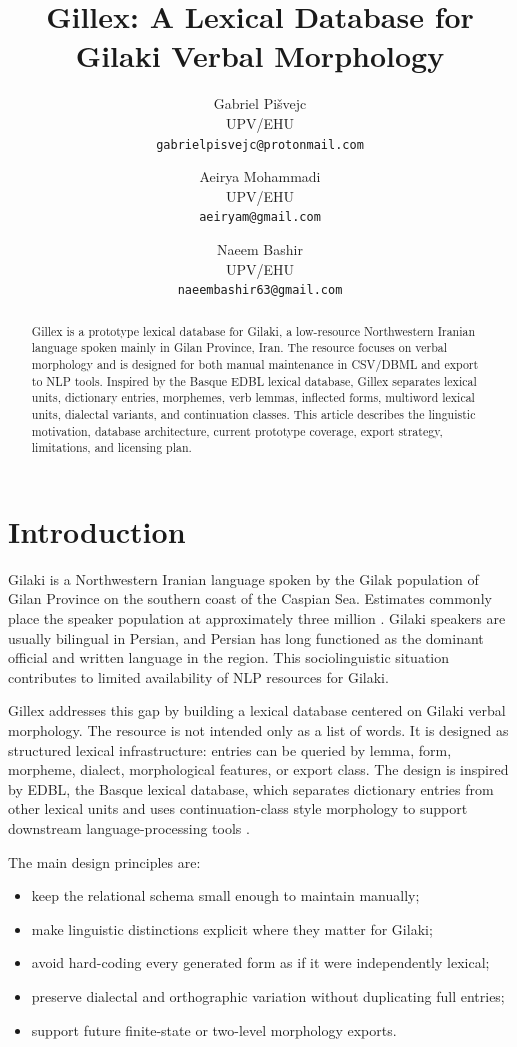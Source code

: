 \documentclass[11pt]{article}
\title{Gillex: A Lexical Database for Gilaki Verbal Morphology}
\author{Gabriel Pišvejc \\
  UPV/EHU \\
  \texttt{gabrielpisvejc@protonmail.com} \and
  Aeirya Mohammadi \\
  UPV/EHU \\
  \texttt{aeiryam@gmail.com} \and
  Naeem Bashir \\
  UPV/EHU \\
  \texttt{naeembashir63@gmail.com} \\}
\begin{document}
\maketitle

\begin{abstract}
Gillex is a prototype lexical database for Gilaki, a low-resource Northwestern Iranian language spoken mainly in Gilan Province, Iran. The resource focuses on verbal morphology and is designed for both manual maintenance in CSV/DBML and export to NLP tools. Inspired by the Basque EDBL lexical database, Gillex separates lexical units, dictionary entries, morphemes, verb lemmas, inflected forms, multiword lexical units, dialectal variants, and continuation classes. This article describes the linguistic motivation, database architecture, current prototype coverage, export strategy, limitations, and licensing plan.
\end{abstract}

\section{Introduction}

Gilaki is a Northwestern Iranian language spoken by the Gilak population of Gilan Province on the southern coast of the Caspian Sea. Estimates commonly place the speaker population at approximately three million \cite{ivanov2015gilaki}. Gilaki speakers are usually bilingual in Persian, and Persian has long functioned as the dominant official and written language in the region. This sociolinguistic situation contributes to limited availability of NLP resources for Gilaki.

Gillex addresses this gap by building a lexical database centered on Gilaki verbal morphology. The resource is not intended only as a list of words. It is designed as structured lexical infrastructure: entries can be queried by lemma, form, morpheme, dialect, morphological features, or export class. The design is inspired by EDBL, the Basque lexical database, which separates dictionary entries from other lexical units and uses continuation-class style morphology to support downstream language-processing tools \cite{aduriz1998edbl, aldezabal2001edbl}.

The main design principles are:
\begin{itemize}
    \item keep the relational schema small enough to maintain manually;
    \item make linguistic distinctions explicit where they matter for Gilaki;
    \item avoid hard-coding every generated form as if it were independently lexical;
    \item preserve dialectal and orthographic variation without duplicating full entries;
    \item support future finite-state or two-level morphology exports.
\end{itemize}
\end{document}
